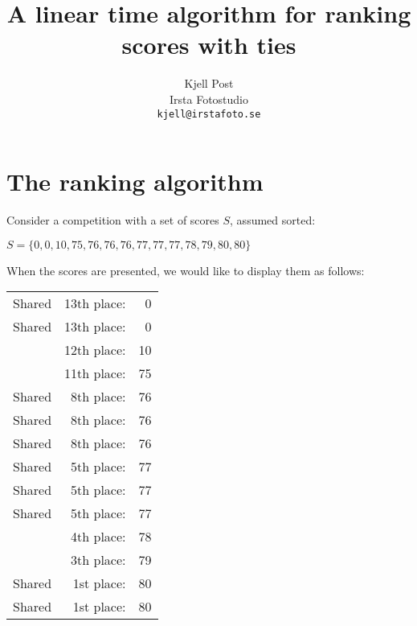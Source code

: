 \documentclass[11pt,a4paper]{article}
\begin{document}
\title{A linear time algorithm for ranking scores with ties}
\author{Kjell Post \\ Irsta Fotostudio \\ {\tt kjell@irstafoto.se}}
\date{}
\maketitle

  
\section{The ranking algorithm}
Consider a competition with a set of scores $S$, assumed sorted:
\begin{tabbing}
  \qquad $S = \{ 0, 0, 10, 75, 76, 76, 76, 77, 77, 77, 78, 79, 80, 80 \}$
\end{tabbing}
When the scores are presented, we would like to display them as follows:

\begin{center}
\begin{tabular}{l r r}
  Shared &  13th place: &   0 \\
  Shared &  13th place: &   0 \\
         &  12th place: &  10 \\
         &  11th place: &  75 \\
  Shared &   8th place: &  76 \\
  Shared &   8th place: &  76 \\
  Shared &   8th place: &  76 \\
  Shared &   5th place: &  77 \\
  Shared &   5th place: &  77 \\
  Shared &   5th place: &  77 \\
         &   4th place: &  78 \\
         &   3th place: &  79 \\
  Shared &   1st place: &  80 \\
  Shared &   1st place: &  80
\end{tabular}
\end{center}
\end{document}
